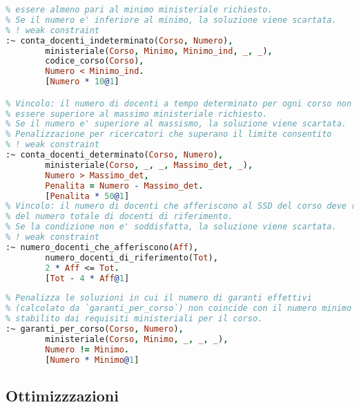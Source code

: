 \begin{lstlisting}[language=prolog, caption=Vincoli di flessibilità]
% Vincolo: il numero di docenti a tempo indeterminato per ogni corso deve
% essere almeno pari al minimo ministeriale richiesto.
% Se il numero e' inferiore al minimo, la soluzione viene scartata.
% ! weak constraint
:~ conta_docenti_indeterminato(Corso, Numero),
        ministeriale(Corso, Minimo, Minimo_ind, _, _),
        codice_corso(Corso),
        Numero < Minimo_ind.
        [Numero * 10@1]

% Vincolo: il numero di docenti a tempo determinato per ogni corso non deve
% essere superiore al massimo ministeriale richiesto.
% Se il numero e' superiore al massismo, la soluzione viene scartata.
% Penalizzazione per ricercatori che superano il limite consentito
% ! weak constraint
:~ conta_docenti_determinato(Corso, Numero),
        ministeriale(Corso, _, _, Massimo_det, _),
        Numero > Massimo_det,
        Penalita = Numero - Massimo_det.
        [Penalita * 50@1]
% Vincolo: il numero di docenti che afferiscono al SSD del corso deve rappresentare almeno il 50%
% del numero totale di docenti di riferimento.
% Se la condizione non e' soddisfatta, la soluzione viene scartata.
% ! weak constraint
:~ numero_docenti_che_afferiscono(Aff), 
        numero_docenti_di_riferimento(Tot),
        2 * Aff <= Tot. 
        [Tot - 4 * Aff@1]
\end{lstlisting}

\begin{lstlisting}[language=prolog, caption=Minimizzazione dei garanti per corso di laurea.]
% Vincolo debole per minimizzare il numero di garanti effettivi rispetto al minimo richiesto.
% Penalizza le soluzioni in cui il numero di garanti effettivi
% (calcolato da `garanti_per_corso`) non coincide con il numero minimo
% stabilito dai requisiti ministeriali per il corso.
:~ garanti_per_corso(Corso, Numero),
        ministeriale(Corso, Minimo, _, _, _),
        Numero != Minimo.
        [Numero * Minimo@1]
\end{lstlisting}

\subsection{Ottimizzzazioni}\label{sec:optimizations}